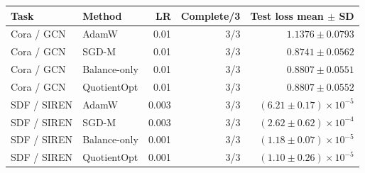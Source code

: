 \par\medskip\noindent\begin{minipage}{\linewidth}

\centering\small
{}
\label{tab:initialization-confirmation}
\begin{tabular}{llrrr}
\toprule Task & Method & LR & Complete/3 & Test loss mean $\pm$ SD\\\midrule
Cora / GCN & AdamW & 0.01 & 3/3 & $1.1376\pm0.0793$\\
Cora / GCN & SGD-M & 0.01 & 3/3 & $0.8741\pm0.0562$\\
Cora / GCN & Balance-only & 0.01 & 3/3 & $0.8807\pm0.0551$\\
\rowcolor{oursbg}Cora / GCN & QuotientOpt & 0.01 & 3/3 & $0.8807\pm0.0552$\\
SDF / SIREN & AdamW & 0.003 & 3/3 & $(6.21\pm0.17)\!\times\!10^{-5}$\\
SDF / SIREN & SGD-M & 0.003 & 3/3 & $(2.62\pm0.62)\!\times\!10^{-4}$\\
SDF / SIREN & Balance-only & 0.001 & 3/3 & $(1.18\pm0.07)\!\times\!10^{-5}$\\
\rowcolor{oursbg}SDF / SIREN & QuotientOpt & 0.001 & 3/3 & $(1.10\pm0.26)\!\times\!10^{-5}$\\
\bottomrule
\end{tabular}

\end{minipage}\par\medskip
\FloatBarrier
\begingroup\small\setlength{\tabcolsep}{3pt}

